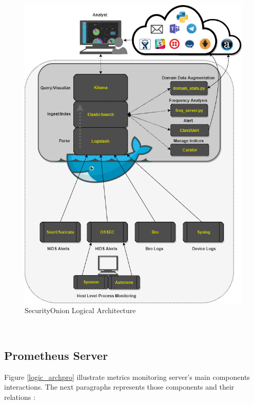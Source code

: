 \begin{figure}[!htpb] 
\begin{center}
\includegraphics[width=6.3 in]{images/best_arch_so_far.png}
\caption{SecurityOnion Logical Architecture}
\label{logic_archso}
\end{center}
\end{figure}~

\newpage
\subsection{Prometheus Server}
Figure \ref{logic_archpro} illustrate metrics monitoring server's main components interactions. The next paragraphs represents those components and their relations :


